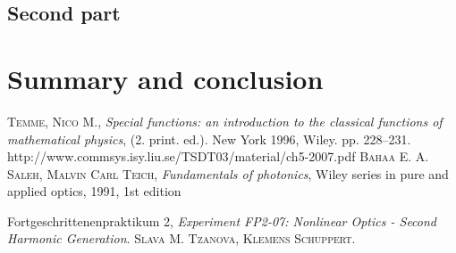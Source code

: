 \documentclass[a4paper,10pt]{article}
\begin{document}
\subsection{Second part}

\section{Summary and conclusion}


\begin{thebibliography}{99}
\textsc{Temme, Nico M.}, \textit{Special functions: an introduction to the classical functions of mathematical physics}, (2. print. ed.). New York 1996, Wiley. pp. 228–231. 
 http://www.commsys.isy.liu.se/TSDT03/material/ch5-2007.pdf
  \textsc{Bahaa E. A. Saleh, Malvin Carl Teich}, \textit{Fundamentals of photonics}, Wiley series in pure and applied optics, 1991, 1st edition

Fortgeschrittenenpraktikum 2, \textit{Experiment FP2-07: Nonlinear Optics - Second Harmonic Generation}. \textsc{Slava M. Tzanova, Klemens Schuppert}.
\end{thebibliography}
\end{document}
